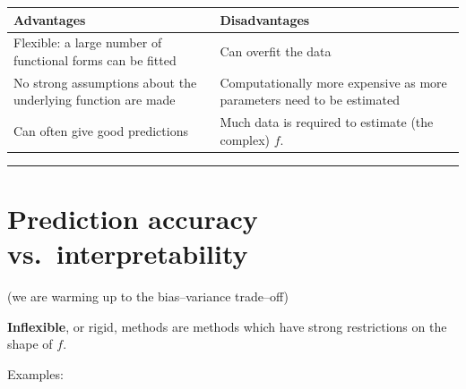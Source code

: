 \documentclass[]{article}
\begin{document}
\begin{longtable}[]{@{}ll@{}}
\toprule
\begin{minipage}[b]{0.47\columnwidth}\raggedright
Advantages\strut
\end{minipage} & \begin{minipage}[b]{0.47\columnwidth}\raggedright
Disadvantages\strut
\end{minipage}\tabularnewline
\midrule
\endhead
\begin{minipage}[t]{0.47\columnwidth}\raggedright
Flexible: a large number of functional forms can be fitted\strut
\end{minipage} & \begin{minipage}[t]{0.47\columnwidth}\raggedright
Can overfit the data\strut
\end{minipage}\tabularnewline
\begin{minipage}[t]{0.47\columnwidth}\raggedright
No strong assumptions about the underlying function are made\strut
\end{minipage} & \begin{minipage}[t]{0.47\columnwidth}\raggedright
Computationally more expensive as more parameters need to be
estimated\strut
\end{minipage}\tabularnewline
\begin{minipage}[t]{0.47\columnwidth}\raggedright
Can often give good predictions\strut
\end{minipage} & \begin{minipage}[t]{0.47\columnwidth}\raggedright
Much data is required to estimate (the complex) \(f\).\strut
\end{minipage}\tabularnewline
\bottomrule
\end{longtable}

\begin{center}\rule{0.5\linewidth}{\linethickness}\end{center}

\hypertarget{prediction-accuracy-vs.interpretability}{%
\section{Prediction accuracy
vs.~interpretability}\label{prediction-accuracy-vs.interpretability}}

(we are warming up to the bias--variance trade--off)

\textbf{Inflexible}, or rigid, methods are methods which have strong
restrictions on the shape of \(f\).

Examples:
\end{document}
